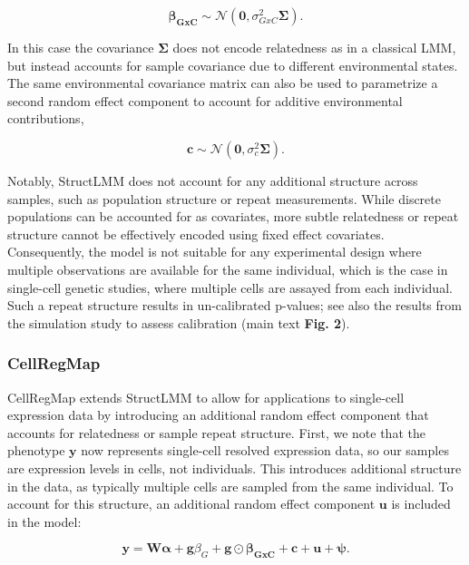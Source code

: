 \begin{equation}\label{eq:beta_GxE}
    \boldsymbol{\beta_{GxC}} \sim \mathcal{N}(\mathbf{0},\sigma_{GxC}^2 \boldsymbol{\Sigma}).
\end{equation} 

In this case the covariance $\boldsymbol{\Sigma}$ does not encode relatedness as in a classical LMM, but instead accounts for sample covariance due to different environmental states.
The same environmental covariance matrix can also be used to parametrize a second random effect component to account for additive environmental contributions,

\begin{equation}
   \mathbf{c} \sim \mathcal{N}(\mathbf{0},\sigma_c^2 \boldsymbol{\Sigma}). 
\end{equation}

Notably, StructLMM does not account for any additional structure across samples, such as population structure or repeat measurements.
While discrete populations can be accounted for as covariates, more subtle relatedness or repeat structure cannot be effectively encoded using fixed effect covariates. 
Consequently, the model is not suitable for any experimental design where multiple observations are available for the same individual, which is the case in single-cell genetic studies, where multiple cells are assayed from each individual. 
Such a repeat structure results in un-calibrated p-values; see also the results from the simulation study to assess calibration (main text \textbf{Fig. 2}). 

\subsubsection*{CellRegMap}
CellRegMap extends StructLMM to allow for applications to single-cell expression data by introducing an additional random effect component that accounts for relatedness or sample repeat structure. 
First, we note that the phenotype $\mathbf{y}$ now represents single-cell resolved expression data, so our samples are expression levels in cells, not individuals. 
This introduces additional structure in the data, as typically multiple cells are sampled from the same individual.
To account for this structure, an additional random effect component $\mathbf{u}$ is included in the model: 

\begin{equation}\label{eq:scStructLMM}
 \mathbf{y} =  \mathbf{W}\boldsymbol{\alpha} + \mathbf{g}\beta_G + \mathbf{g} \odot \boldsymbol{\beta_{GxC}} + \mathbf{c} + \mathbf{u} + \boldsymbol{\psi}. 
\end{equation}

